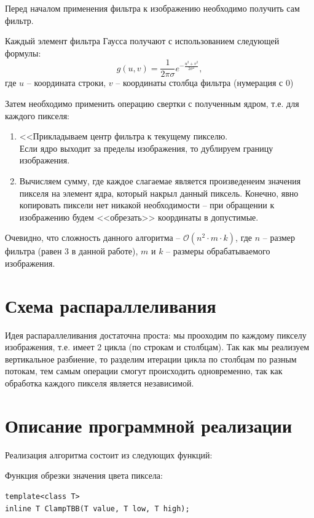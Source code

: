 \documentclass{report}
\begin{document}
Перед началом применения фильтра к изображению необходимо получить сам фильтр.

Каждый элемент фильтра Гаусса получают с использованием следующей формулы:
$$
    g(u, v) = \frac{1}{2 \pi \sigma} e^{-\frac{u^2+v^2}{2\sigma^2}},
$$
где $u$ -- координата строки, $v$ -- координаты столбца фильтра (нумерация с $0$)

Затем необходимо применить операцию свертки с полученным ядром, т.е. для каждого пикселя:
\begin{enumerate}
    \item <<Прикладываем центр фильтра к текущему пикселю. \\
    Если ядро выходит за пределы изображения, то дублируем границу изображения.
    \item Вычисляем сумму, где каждое слагаемае является произведенеим значения пикселя на элемент ядра, который накрыл данный пиксель. Конечно, явно копировать пиксели нет никакой необходимости -- при обращении к изображению будем <<обрезать>> координаты в допустимые. 
\end{enumerate}

Очевидно, что сложность данного алгоритма -- $\mathcal{O}(n^2 \cdot m \cdot k)$, где $n$ -- размер фильтра (равен 3 в данной работе), $m$ и $k$ -- размеры обрабатываемого изображения.

\newpage

\section*{Схема распараллеливания}

Идея распараллеливания достаточна проста: мы прооходим по каждому пикселу изображения, т.е. имеет 2 цикла (по строкам и столбцам). Так как мы реализуем вертикальное разбиение, то разделим итерации цикла по столбцам по разным потокам, тем самым операции смогут происходить одновременно, так как обработка каждого пикселя является независимой.

\newpage

\section*{Описание программной реализации}

Реализация алгоритма состоит из следующих функций:

    
Функция обрезки значения цвета пиксела:
\begin{lstlisting}[numbers=none]
template<class T>
inline T ClampTBB(T value, T low, T high);
\end{lstlisting}
\end{document}
